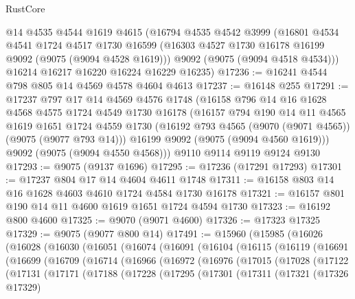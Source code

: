 \begin{lexlean}{RustCore}
\begin{coremodule}
    @14
    @4535
    @4544
    @1619
    @4615
    (@16794
      @4535
      @4542
      @3999
      (@16801
        @4534
        @4541
        @1724
        @4517
        @1730
        @16599
        (@16303 @4527 @1730 @16178 @16199 @9092 (@9075 (@9094 @4528 @1619)))
        @9092
        (@9075 (@9094 @4518 @4534)))
      @16214
      @16217
      @16220
      @16224
      @16229
      @16235)
@17236 := @16241 @4544 @798 @805 @14 @4569 @4578 @4604 @4613
@17237 := @16148 @255
@17291 := @17237
    @797
    @17
    @14
    @4569
    @4576
    @1748
    (@16158
      @796
      @14
      @16
      @1628
      @4568
      @4575
      @1724
      @4549
      @1730
      @16178
      (@16157
        @794
        @190
        @14
        @11
        @4565
        @1619
        @1651
        @1724
        @4559
        @1730
        (@16192 @793 @4565 (@9070 (@9071 @4565)) (@9075 (@9077 @793 @14)))
        @16199
        @9092
        (@9075 (@9094 @4560 @1619)))
      @9092
      (@9075 (@9094 @4550 @4568)))
    @9110
    @9114
    @9119
    @9124
    @9130
@17293 := @9075 (@9137 @1696)
@17295 := @17236 (@17291 @17293)
@17301 := @17237 @804 @17 @14 @4604 @4611 @1748
@17311 := @16158 @803 @14 @16 @1628 @4603 @4610 @1724 @4584 @1730 @16178
@17321 := @16157 @801 @190 @14 @11 @4600 @1619 @1651 @1724 @4594 @1730
@17323 := @16192 @800 @4600
@17325 := @9070 (@9071 @4600)
@17326 := @17323 @17325
@17329 := @9075 (@9077 @800 @14)
@17491 := @15960
    (@15985
      (@16026
        (@16028
          (@16030
            (@16051
              (@16074
                (@16091
                  (@16104
                    (@16115
                      (@16119
                        (@16691
                          (@16699
                            (@16709
                              (@16714
                                (@16966
                                  (@16972
                                    (@16976
                                      (@17015
                                        (@17028
                                          (@17122
                                            (@17131
                                              (@17171
                                                (@17188
                                                  (@17228
                                                    (@17295
                                                      (@17301
                                                        (@17311
                                                          (@17321
                                                            (@17326 @17329)

\end{coremodule}
\end{lexlean}
